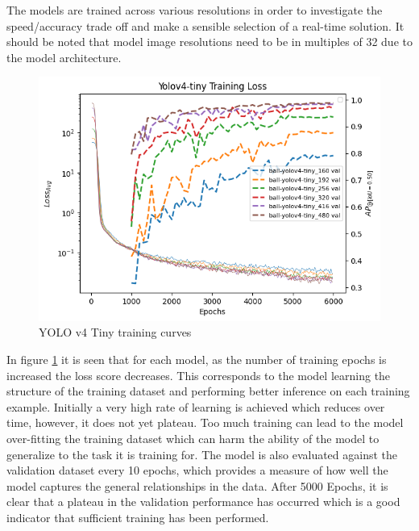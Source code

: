 \documentclass[a4paper,twoside,12pt]{report}
\begin{document}
The models are trained across various resolutions in order to investigate the speed/accuracy trade off and make a sensible selection of a real-time solution. It should be noted that model image resolutions need to be in multiples of 32 due to the model architecture.

\begin{figure}[h!]
\begin{center}
\includegraphics[width=14cm]{images/yolov4tiny_train.png}
\caption{YOLO v4 Tiny training curves}
\label{fig:yolov4tiny_train}
\end{center}
\end{figure}

In figure \ref{fig:yolov4tiny_train} it is seen that for each model, as the number of training epochs is increased the loss score decreases. This corresponds to the model learning the structure of the training dataset and performing better inference on each training example. Initially a very high rate of learning is achieved which reduces over time, however, it does not yet plateau. Too much training can lead to the model over-fitting the training dataset which can harm the ability of the model to generalize to the task it is training for. The model is also evaluated against the validation dataset every 10 epochs, which provides a measure of how well the model captures the general relationships in the data. After 5000 Epochs, it is clear that a plateau in the validation performance has occurred which is a good indicator that sufficient training has been performed. 
\end{document}
